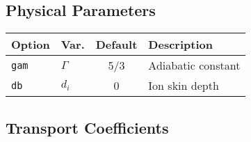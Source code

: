 \subsection{Physical Parameters}

\begin{tabular}{llcl}
  \textbf{Option}&\textbf{Var.}&\textbf{Default}&\textbf{Description}\\
  \hline
  \texttt{gam}    & $\Gamma$& 5/3 & Adiabatic constant\\
  \texttt{db}     & $d_i$   & 0   & Ion skin depth\\ 
\end{tabular}


\subsection{Transport Coefficients}


